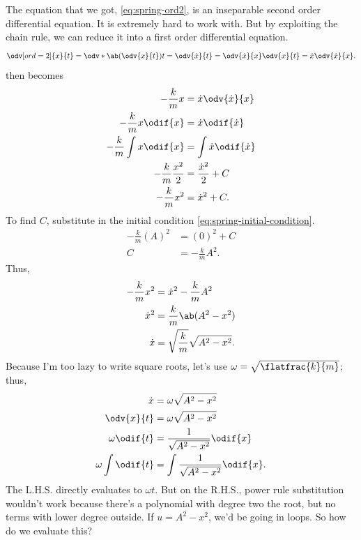The equation that we got, \cref{eq:spring-ord2}, is an inseparable second order differential equation. It is extremely hard to work with. But by exploiting the chain rule, we can reduce it into a first order differential equation.
\begin{equation}
	\odv[ord = 2]{x}{t} = \odv*{\ab(\odv{x}{t})}{t} = \odv{\dot{x}}{t} = \odv{\dot{x}}{x}\odv{x}{t} = \dot{x}\odv{\dot{x}}{x}.
\end{equation}
 then becomes
\begin{align}
	-\frac{k}{m}x              & = \dot{x}\odv{\dot{x}}{x}   \\
	-\frac{k}{m}x\odif{x}      & = \dot{x}\odif{\dot{x}}     \\
	-\frac{k}{m}\int x\odif{x} & = \int\dot{x}\odif{\dot{x}} \\
	-\frac{k}{m}\frac{x^2}{2}  & = \frac{\dot{x}^2}{2} + C   \\
	-\frac{k}{m}x^2            & = \dot{x}^2 + C.
\end{align}
To find $C$, substitute in the initial condition \cref{eq:spring-initial-condition}.
\begin{align}
	-\frac{k}{m}(A)^2 & = (0)^2 + C        \\
	C                 & = -\frac{k}{m}A^2.
\end{align}
Thus,
\begin{align}
	-\frac{k}{m}x^2 & = \dot{x}^2 - \frac{k}{m}A^2          \\
	\dot{x}^2       & = \frac{k}{m}\ab(A^2 - x^2)           \\
	\dot{x}         & = \sqrt{\frac{k}{m}}\sqrt{A^2 - x^2}.
\end{align}
Because I'm too lazy to write square roots, let's use $\omega = \sqrt{\flatfrac{k}{m}}$; thus,
\begin{align}
	\dot{x}            & = \omega\sqrt{A^2 - x^2}                                           \\
	\odv{x}{t}         & = \omega\sqrt{A^2 - x^2}                                           \\
	\omega\odif{t}     & = \frac{1}{\sqrt{A^2 - x^2}}\odif{x}                               \\
	\omega\int\odif{t} & = \int\frac{1}{\sqrt{A^2 - x^2}}\odif{x}. \label{eq:spring-ord1-d}
\end{align}
The L.H.S. directly evaluates to $\omega t$. But on the R.H.S., power rule substitution wouldn't work because there's a polynomial with degree two the root, but no terms with lower degree outside. If $u = A^2 - x^2$, we'd be going in loops. So how do we evaluate this?

